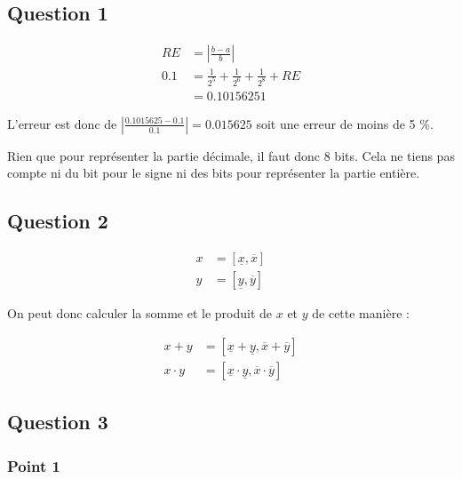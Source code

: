 \subsection{Question 1}

\begin{equation}
	\begin{aligned}
		RE &= |\frac{b-a}{b}|\\
		0.1 &= \frac{1}{2^5} + \frac{1}{2^6} + \frac{1}{2^8} + RE \\
		&= 0.1015625
	1\end{aligned}
\end{equation}

L'erreur est donc de $|\frac{0.1015625 - 0.1}{0.1}| = 0.015625$ soit une erreur de moins de 5 \%.

Rien que pour représenter la partie décimale, il faut donc 8 bits. Cela ne tiens pas compte ni du bit pour le signe ni des bits pour représenter la partie entière.

\subsection{Question 2}

\begin{equation}
	\begin{aligned}
		x &= [\underline{x}, \overline{x}]\\
		y &= [\underline{y}, \overline{y}]
	\end{aligned}
\end{equation}

On peut donc calculer la somme et le produit de $x$ et $y$ de cette manière :

\begin{equation}
	\begin{aligned}
		x + y &= [\underline{x} + \underline{y}, \overline{x} + \overline{y}]\\
		x \cdot y &= [\underline{x} \cdot \underline{y}, \overline{x} \cdot \overline{y}]
	\end{aligned}
\end{equation}

\subsection{Question 3}

\subsubsection{Point 1}

